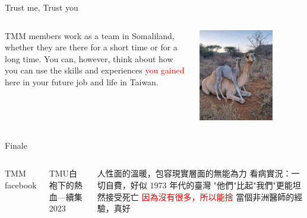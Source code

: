 \documentclass[aspectratio=169]{beamer}
\begin{document}
\begin{frame}{Trust me, Trust you}

\begin{columns}
    
\begin{outline}


\1 TMM members work as a team in Somaliland, whether they are there for a short time or for a long time.
\1 You can, however, think about how you can use the skills and experiences \textcolor{red}{you gained} here in your future job and life in Taiwan.

\end{outline}

\includegraphics[width=0.7\textwidth]{IMG-5113.JPG}
\end{columns}

\end{frame}


\begin{frame}{Finale}
\begin{columns}
    
TMM facebook

TMU白袍下的熱血---續集2023
\begin{outline}


    \1 人性面的溫暖，包容現實層面的無能為力
        \2 看病實況：一切自費，好似 1973 年代的臺灣
        \2 "他們"比起"我們"更能坦然接受死亡
        \2 \textcolor{red}{因為沒有很多，所以能捨}
    \1 當個非洲醫師的經驗，真好

\end{outline}


\end{columns}
\end{frame}


\end{document}
